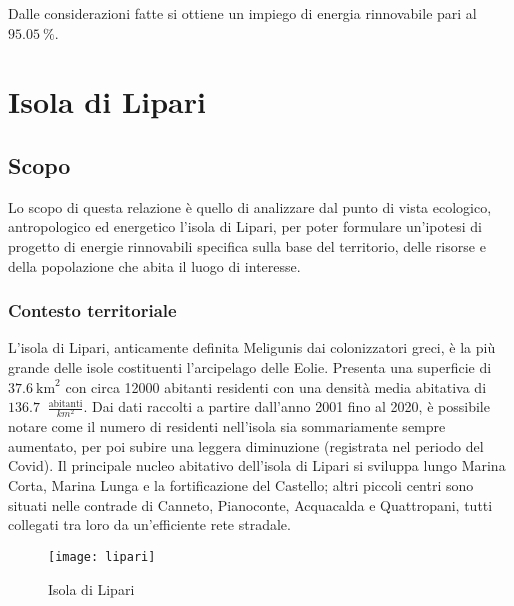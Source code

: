 \documentclass[fleqn,11pt]{SelfArx} %
\begin{document}
Dalle considerazioni fatte si ottiene un impiego di energia rinnovabile pari al \(\SI{95.05}{\percent}\).



\section{Isola di Lipari}
\subsection{Scopo}
Lo scopo di questa relazione è quello di analizzare dal punto di vista ecologico, antropologico ed energetico l'isola di Lipari, per poter formulare un'ipotesi di progetto di energie rinnovabili specifica sulla base del territorio, delle risorse e della popolazione che abita il luogo di interesse.

\subsubsection{Contesto territoriale}
L'isola di Lipari, anticamente definita Meligunis dai colonizzatori greci, è la più grande delle isole costituenti l'arcipelago delle Eolie. 
Presenta una superficie di \(\SI{37.6}{\km\squared}\) con circa 12000 abitanti residenti con  una densità media abitativa di \(\SI{136.7}{}\) \(\frac{\text{abitanti}}{km^2}\).  
Dai dati raccolti a partire dall'anno 2001 fino al 2020, è possibile notare come il numero di residenti nell'isola sia sommariamente sempre aumentato, per poi subire una leggera diminuzione (registrata nel periodo del Covid). 
Il principale nucleo abitativo dell'isola di Lipari si sviluppa lungo Marina Corta, Marina Lunga e la fortificazione del Castello; altri piccoli centri sono situati nelle contrade di Canneto, Pianoconte, Acquacalda e Quattropani, tutti collegati tra loro da un'efficiente rete stradale.

\begin{figure}[ht]\centering
	\texttt{[image: lipari]}
	\caption{Isola di Lipari}
	\label{fig:lipari}
\end{figure}
\end{document}
